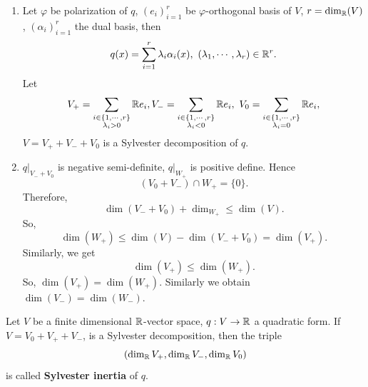 \begin{proofenv}
    \quad 
    \begin{enumerate}
        \item Let $\varphi$ be polarization of $q$, $\left(e_i\right)_{i=1}^r $ be $\varphi$-orthogonal basis of $V$, $r = \dim_{\mathbb{R}}(V)$, $\left(\alpha_i\right)_{i=1}^r$ the dual basis, then 
            $$ q(x) = \sum_{i=1}^{r} \lambda_{i} \alpha_i(x) ,\ \left(\lambda_1,\cdots , \lambda_r\right) \in \mathbb{R}^r.$$
            Let
            $$ V_+ = \sum_{\substack{i\in \{1,\cdots,r\}\\ \lambda_i>0}} \mathbb{R} e_i, V_- = \sum_{\substack{i\in \{1,\cdots,r\}\\ \lambda_i<0}} \mathbb{R} e_i,\ V_0 = \sum_{\substack{i\in \{1,\cdots,r\}\\ \lambda_i=0}} \mathbb{R} e_i,$$
            $V = V_+ + V_- +V_0$ is a Sylvester decomposition of $q$.
        \item $q|_{V_- + V_0}$ is negative semi-definite, $q|_{W_+}$ is positive define. 
            Hence 
            $$ \left(V_0 + V_-\right)\cap W_+ = \{0\}.$$
            Therefore,
            $$ \dim\left(V_- + V_0\right) + \dim_{W_+} \le \dim(V).$$
            So,
            $$ \dim(W_+) \le \dim(V) - \dim(V_- + V_0) = \dim(V_+).$$
            Similarly, we get
            $$ \dim(V_+) \le \dim(W_+).$$
            So, $\dim(V_+)= \dim(W_+)$. Similarly we obtain $\dim(V_-) = \dim(W_-)$.
    \end{enumerate}
    
\end{proofenv}
\begin{definitionenv}
    Let $V$ be a finite dimensional $\mathbb{R}$-vector space, $q:V\rightarrow \mathbb{R}$ a quadratic form.
    If $V = V_0 + V_+ +V_-$, is a Sylvester decomposition, then the triple
    $$ \left(\dim_{\mathbb{R}} V_+, \dim_{\mathbb{R}} V_-, \dim_{\mathbb{R}} V_0\right)$$
    is called \textbf{Sylvester inertia} of $q$.
\end{definitionenv}
